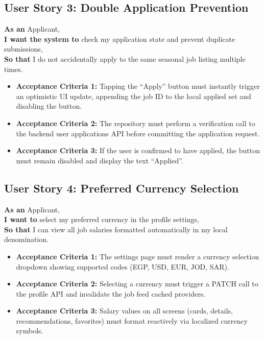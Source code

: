 \subsection{User Story 3: Double Application Prevention}
\textbf{As an} Applicant,\\
\textbf{I want the system to} check my application state and prevent duplicate submissions,\\
\textbf{So that} I do not accidentally apply to the same seasonal job listing multiple times.
\begin{itemize}
    \item \textbf{Acceptance Criteria 1:} Tapping the ``Apply'' button must instantly trigger an optimistic UI update, appending the job ID to the local applied set and disabling the button.
    \item \textbf{Acceptance Criteria 2:} The repository must perform a verification call to the backend user applications API before committing the application request.
    \item \textbf{Acceptance Criteria 3:} If the user is confirmed to have applied, the button must remain disabled and display the text ``Applied''.
\end{itemize}

\subsection{User Story 4: Preferred Currency Selection}
\textbf{As an} Applicant,\\
\textbf{I want to} select my preferred currency in the profile settings,\\
\textbf{So that} I can view all job salaries formatted automatically in my local denomination.
\begin{itemize}
    \item \textbf{Acceptance Criteria 1:} The settings page must render a currency selection dropdown showing supported codes (EGP, USD, EUR, JOD, SAR).
    \item \textbf{Acceptance Criteria 2:} Selecting a currency must trigger a PATCH call to the profile API and invalidate the job feed cached providers.
    \item \textbf{Acceptance Criteria 3:} Salary values on all screens (cards, details, recommendations, favorites) must format reactively via localized currency symbols.
\end{itemize}


